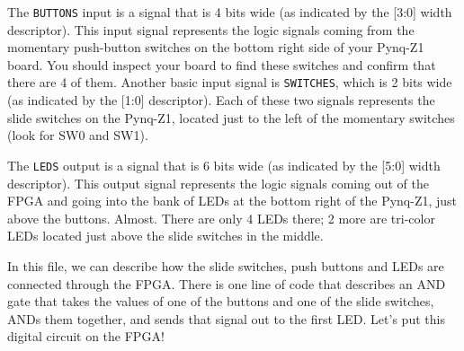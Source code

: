 \documentclass[11pt]{article}
\begin{document}
The \verb|BUTTONS| input is a signal that is 4 bits wide (as indicated by the [3:0] width descriptor). This input signal represents the logic signals coming from the momentary push-button switches on the bottom right side of your Pynq-Z1 board. You should inspect your board to find these switches and confirm that there are 4 of them. Another basic input signal is \verb|SWITCHES|, which is 2 bits wide (as indicated by the [1:0] descriptor). Each of these two signals represents the slide switches on the Pynq-Z1, located just to the left of the momentary switches (look for SW0 and SW1).

The \verb|LEDS| output is a signal that is 6 bits wide (as indicated by the [5:0] width descriptor). This output signal represents the logic signals coming out of the FPGA and going into the bank of LEDs at the bottom right of the Pynq-Z1, just above the buttons. Almost. There are only 4 LEDs there; 2 more are tri-color LEDs located just above the slide switches in the middle.

In this file, we can describe how the slide switches, push buttons and LEDs are connected through the FPGA. There is one line of code that describes an AND gate that takes the values of one of the buttons and one of the slide switches, ANDs them together, and sends that signal out to the first LED. Let's put this digital circuit on the FPGA!
\end{document}
